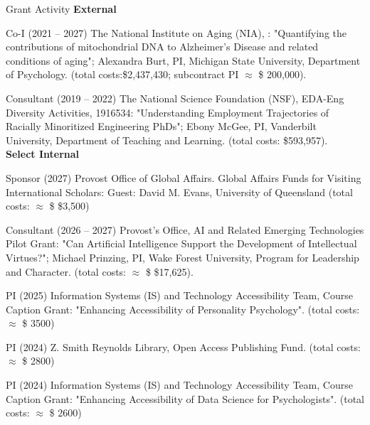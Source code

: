 \begin{rSection}{\textrm{Grant Activity}}%
{\large \textbf{External}}%
\begin{etaremune}
\item Co-I (2021 – 2027) The National Institute on Aging (NIA), : "Quantifying the contributions of mitochondrial DNA to Alzheimer's Disease and related conditions of aging"; Alexandra Burt, PI, Michigan State University, Department of Psychology. (total costs:\$2,437,430; subcontract PI $\approx$  \$ 200,000). %
\item Consultant (2019 – 2022) The National Science Foundation (NSF), EDA-Eng Diversity Activities, 1916534: "Understanding Employment Trajectories of Racially Minoritized Engineering PhDs"; Ebony McGee, PI, Vanderbilt University, Department of Teaching and Learning. (total costs: \$593,957).
\smallskip\\
\hspace*{-8mm}\large{\bf{Select Internal}}%
\item Sponsor (2027) Provost Office of Global Affairs. Global Affairs Funds for Visiting International Scholars: Guest: David M. Evans, University of Queensland (total costs: $\approx$ \$ \$3,500)
\item Consultant (2026 – 2027) Provost's Office, AI and Related Emerging Technologies Pilot Grant: "Can Artificial Intelligence Support the Development of Intellectual Virtues?"; Michael Prinzing, PI, Wake Forest University, Program for Leadership and Character. (total costs: $\approx$ \$ \$17,625).
\item PI (2025) Information Systems (IS) and Technology Accessibility Team, Course Caption Grant: "Enhancing Accessibility of Personality Psychology". (total costs: $\approx$ \$ 3500)%
\item PI (2024) Z. Smith Reynolds Library, Open Access Publishing Fund. (total costs: $\approx$ \$ 2800) %
\item PI (2024) Information Systems (IS) and Technology Accessibility Team, Course Caption Grant: "Enhancing Accessibility of Data Science for Psychologists". (total costs: $\approx$ \$ 2600)%
\end{etaremune}
\end{rSection}
